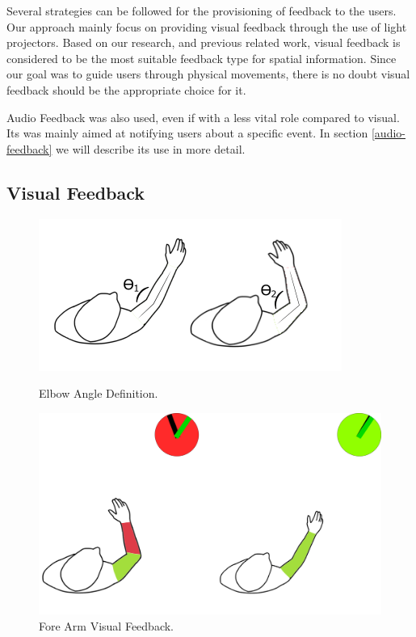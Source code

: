 Several strategies can be followed for the provisioning of feedback to the users. 
Our approach mainly focus on providing visual feedback through the use of light projectors. 
Based on our research, and previous related work, visual feedback is considered to be the most suitable feedback type for spatial information. 
Since our goal was to guide users through physical movements, there is no doubt visual feedback should be the appropriate choice for it.

Audio Feedback was also used, even if with a less vital role compared to visual.
Its was mainly aimed at notifying users about a specific event. In section \ref{audio-feedback} we will describe its use in more detail.


\subsection{Visual Feedback}
\label{vision-feedback}


\begin{figure}[!t]
  \centering
  \includegraphics[width=0.7\linewidth]{imgs/approach/elbowangle}
    \caption{Elbow Angle Definition.}
    \label{fig:elbowangle}
    \endminipage\hfill
{}
  \centering
  \includegraphics[width=0.9\linewidth]{imgs/approach/forearmfeedback}
    \caption{Fore Arm Visual Feedback.}
    \label{fig:forearmfeedback}
    \endminipage
\end{figure}



